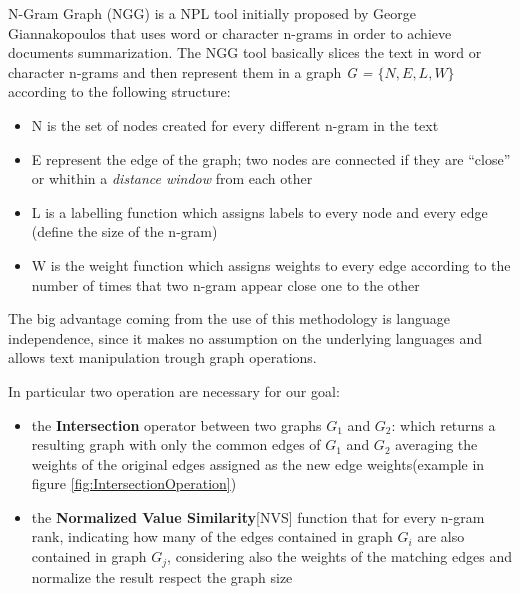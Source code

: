 N-Gram Graph (NGG) is a NPL tool initially proposed by George Giannakopoulos \cite{Ngram} that uses word or character n-grams in order to achieve documents summarization. The NGG tool basically slices the text in word or character n-grams and then represent them in a graph \emph{G = $\lbrace N,E,L,W\rbrace$} according to the following structure:
\begin{itemize}
	\item N is the set of nodes created for every different n-gram in the text
	\item E represent the edge of the graph; two nodes are connected if they are ``close'' or whithin a \emph{distance window} from each other
	\item L is a labelling function which assigns labels to every node and every edge (define the size of the n-gram)
	\item W is the weight function which assigns weights to every edge according to the number of times that two n-gram appear close one to the other
\end{itemize}

The big advantage coming from the use of this methodology is language
independence, since it makes no assumption on the underlying languages and
allows text manipulation trough graph operations.

In particular two operation are necessary for our goal:
\begin{itemize}
\item the \textbf{Intersection} operator between two graphs $G_1$ and $G_2$: which returns a resulting graph with only the common edges of $G_1$ and $G_2$ averaging the weights of the original edges assigned as the new edge weights(example in figure \ref{fig:IntersectionOperation})
\item the \textbf{Normalized Value Similarity}[NVS] function that for every n-gram rank, indicating how many of the edges contained in graph $G_i$ are also contained in graph $G_j$, considering also the weights of the matching edges and normalize the result respect the graph size
\end{itemize}
 
